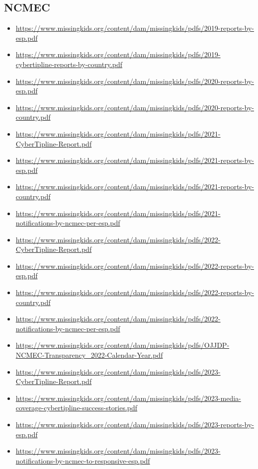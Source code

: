 {\subsection*{NCMEC}
{\footnotesize
\begin{itemize}
\item[]\url{https://www.missingkids.org/content/dam/missingkids/pdfs/2019-reports-by-esp.pdf}
\item[]\url{https://www.missingkids.org/content/dam/missingkids/pdfs/2019-cybertipline-reports-by-country.pdf}
\item[]\url{https://www.missingkids.org/content/dam/missingkids/pdfs/2020-reports-by-esp.pdf}
\item[]\url{https://www.missingkids.org/content/dam/missingkids/pdfs/2020-reports-by-country.pdf}
\item[]\url{https://www.missingkids.org/content/dam/missingkids/pdfs/2021-CyberTipline-Report.pdf}
\item[]\url{https://www.missingkids.org/content/dam/missingkids/pdfs/2021-reports-by-esp.pdf}
\item[]\url{https://www.missingkids.org/content/dam/missingkids/pdfs/2021-reports-by-country.pdf}
\item[]\url{https://www.missingkids.org/content/dam/missingkids/pdfs/2021-notifications-by-ncmec-per-esp.pdf}
\item[]\url{https://www.missingkids.org/content/dam/missingkids/pdfs/2022-CyberTipline-Report.pdf}
\item[]\url{https://www.missingkids.org/content/dam/missingkids/pdfs/2022-reports-by-esp.pdf}
\item[]\url{https://www.missingkids.org/content/dam/missingkids/pdfs/2022-reports-by-country.pdf}
\item[]\url{https://www.missingkids.org/content/dam/missingkids/pdfs/2022-notifications-by-ncmec-per-esp.pdf}
\item[]\url{https://www.missingkids.org/content/dam/missingkids/pdfs/OJJDP-NCMEC-Transparency_2022-Calendar-Year.pdf}
\item[]\url{https://www.missingkids.org/content/dam/missingkids/pdfs/2023-CyberTipline-Report.pdf}
\item[]\url{https://www.missingkids.org/content/dam/missingkids/pdfs/2023-media-coverage-cybertipline-success-stories.pdf}
\item[]\url{https://www.missingkids.org/content/dam/missingkids/pdfs/2023-reports-by-esp.pdf}
\item[]\url{https://www.missingkids.org/content/dam/missingkids/pdfs/2023-notifications-by-ncmec-to-responsive-esp.pdf}

\end{itemize}}}
